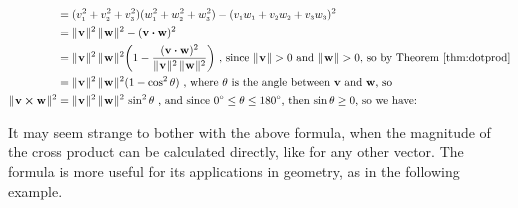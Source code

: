 \begin{align*}
  &= (v_{\scriptscriptstyle 1}^{2} + v_{\scriptscriptstyle 2}^{2} + v_{\scriptscriptstyle 3}^{2})(w_{\scriptscriptstyle 1}^{2} + w_{\scriptscriptstyle 2}^{2} + w_{\scriptscriptstyle 3}^{2}) -
   (v_{\scriptscriptstyle 1}w_{\scriptscriptstyle 1} + v_{\scriptscriptstyle 2}w_{\scriptscriptstyle 2} + v_{\scriptscriptstyle 3}w_{\scriptscriptstyle 3})^2\\
  &= \lVert\mspace{1mu}\textbf{v}\mspace{1mu}\rVert^2 \, \lVert\mspace{1mu}\textbf{w}\mspace{1mu}\rVert^2 - (\textbf{v} \bm{\cdot} \textbf{w})^2\\
  &= \lVert\mspace{1mu}\textbf{v}\mspace{1mu}\rVert^2 \, \lVert\mspace{1mu}\textbf{w}\mspace{1mu}\rVert^2 \biggl( 1 -
   \frac{(\textbf{v} \bm{\cdot} \textbf{w})^2}{\lVert\mspace{1mu}\textbf{v}\mspace{1mu}\rVert^2 \, \lVert\mspace{1mu}\textbf{w}\mspace{1mu}\rVert^2} \biggr)
   \text{~,~since $\lVert\mspace{1mu}\textbf{v}\mspace{1mu}\rVert > 0$ and $\lVert\mspace{1mu}\textbf{w}\mspace{1mu}\rVert > 0$, so by Theorem \ref{thm:dotprod}}\\
  &= \lVert\mspace{1mu}\textbf{v}\mspace{1mu}\rVert^2 \, \lVert\mspace{1mu}\textbf{w}\mspace{1mu}\rVert^2 (1 - \cos^2 \theta)
  \text{~,~where $\theta$ is the angle between \textbf{v} and \textbf{w}, so}\\
  \lVert\mspace{1mu}\textbf{v} \bm{\times} \textbf{w}\mspace{1mu}\rVert^2 &= \lVert\mspace{1mu}\textbf{v}\mspace{1mu}\rVert^2 \, \lVert\mspace{1mu}\textbf{w}\mspace{1mu}\rVert^2 \, \sin^2 \theta
  \text{~,~and since $0^\circ \le \theta \le 180^\circ$, then $\sin \theta \ge 0$, so we have:}
\end{align*}
\smallskip

It may seem strange to bother with the above formula, when the magnitude of the cross product can be calculated
directly, like for any other vector. The formula is more useful for its applications in geometry, as in the
following example.

